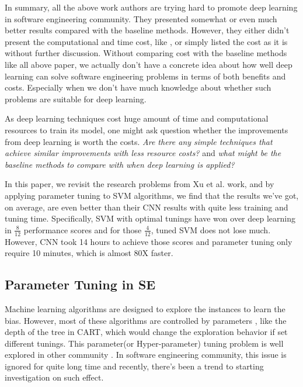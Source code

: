  In summary, all the above work authors are trying hard to promote deep learning in software
 engineering community. They presented somewhat or even much better results compared with
 the baseline methods. However, they either didn't present the computational and time cost, like \cite{white2016deep,white2015toward,lam2015combining,choetkiertikul2016deep}, or simply listed
 the cost as it is without further discussion\cite{wang2016automatically, gu2016deep, xu2016predicting}. Without comparing cost with the baseline methods like all above paper,
 we actually don't have a concrete idea about how well deep learning can solve software engineering problems in terms of both benefits and costs. Especially when we don't have much knowledge about
 whether such problems are suitable for deep learning. 
 
As deep learning techniques cost huge amount of time and computational
resources to train its model,
one might ask question whether the improvements from deep learning is worth
the costs. {\it Are there any simple techniques that achieve similar improvements
with less resource costs?} and {\it what might be the baseline methods to compare with
when deep learning is applied?}

In this paper, we revisit the research problems 
from Xu et al.\cite{xu2016predicting} work, and by applying parameter tuning 
to SVM algorithms, we find that the results we've got, on average, are even 
better than their CNN results with quite less training and tuning time.
Specifically, SVM with optimal tunings have won over deep learning 
in $\frac{8}{12}$ performance scores and for those $\frac{4}{12}$,
tuned SVM  does not lose much. However, CNN took 14 hours to achieve
those scores and parameter tuning only require 10 minutes, which is almost 80X faster.

\subsection{Parameter Tuning in SE}
Machine learning algorithms are designed to explore the instances
to learn the bias. However, most of these algorithms are controlled by parameters
, like the depth of the tree in CART, which would change the
exploration behavior if set different tunings. This parameter(or Hyper-parameter)
tuning problem is well explored in other community \cite{bergstra2012random,li2016hyperband}.
In software engineering community, this issue is ignored for quite
long time and recently, there's been a trend to starting investigation on such effect.


